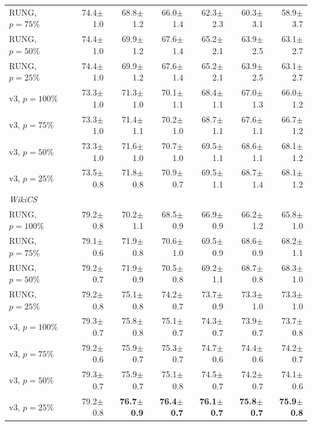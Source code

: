 \documentclass{article}
\newcommand{\score}[2]{#1{\scriptsize$\pm$#2}}
\begin{document}
\begin{center}
\begin{tabular}{lrrrrrr}
RUNG, $p{=}75\%$  & \score{74.4}{1.0} & \score{68.8}{1.2} & \score{66.0}{1.4} & \score{62.3}{2.3} & \score{60.3}{3.1} & \score{58.9}{3.7} \\
RUNG, $p{=}50\%$  & \score{74.4}{1.0} & \score{69.9}{1.2} & \score{67.6}{1.4} & \score{65.2}{2.1} & \score{63.9}{2.5} & \score{63.1}{2.7} \\
RUNG, $p{=}25\%$  & \score{74.4}{1.0} & \score{69.9}{1.2} & \score{67.6}{1.4} & \score{65.2}{2.1} & \score{63.9}{2.5} & \score{63.1}{2.7} \\
\addlinespace
v3, $p{=}100\%$   & \score{73.3}{1.0} & \score{71.3}{1.0} & \score{70.1}{1.1} & \score{68.4}{1.1} & \score{67.0}{1.3} & \score{66.0}{1.2} \\
v3, $p{=}75\%$    & \score{73.3}{1.0} & \score{71.4}{1.1} & \score{70.2}{1.0} & \score{68.7}{1.1} & \score{67.6}{1.1} & \score{66.7}{1.2} \\
v3, $p{=}50\%$    & \score{73.3}{1.0} & \score{71.6}{1.0} & \score{70.7}{1.0} & \score{69.5}{1.1} & \score{68.6}{1.1} & \score{68.1}{1.2} \\
v3, $p{=}25\%$    & \score{73.5}{0.8} & \score{71.8}{0.8} & \score{70.9}{0.7} & \score{69.5}{1.1} & \score{68.7}{1.4} & \score{68.1}{1.2} \\
\midrule
\multicolumn{7}{l}{\textit{WikiCS}} \\
\midrule
RUNG, $p{=}100\%$ & \score{79.2}{0.8} & \score{70.2}{1.1} & \score{68.5}{0.9} & \score{66.9}{0.9} & \score{66.2}{1.2} & \score{65.8}{1.0} \\
RUNG, $p{=}75\%$  & \score{79.1}{0.6} & \score{71.9}{0.8} & \score{70.6}{1.0} & \score{69.5}{0.9} & \score{68.6}{0.9} & \score{68.2}{1.1} \\
RUNG, $p{=}50\%$  & \score{79.2}{0.7} & \score{71.9}{0.9} & \score{70.5}{0.8} & \score{69.2}{1.1} & \score{68.7}{0.8} & \score{68.3}{1.0} \\
RUNG, $p{=}25\%$  & \score{79.2}{0.8} & \score{75.1}{0.8} & \score{74.2}{0.7} & \score{73.7}{0.9} & \score{73.3}{1.0} & \score{73.3}{1.0} \\
\addlinespace
v3, $p{=}100\%$   & \score{79.3}{0.7} & \score{75.8}{0.8} & \score{75.1}{0.7} & \score{74.3}{0.7} & \score{73.9}{0.7} & \score{73.7}{0.8} \\
v3, $p{=}75\%$    & \score{79.2}{0.6} & \score{75.9}{0.7} & \score{75.3}{0.7} & \score{74.7}{0.6} & \score{74.4}{0.6} & \score{74.2}{0.7} \\
v3, $p{=}50\%$    & \score{79.3}{0.7} & \score{75.9}{0.7} & \score{75.1}{0.8} & \score{74.5}{0.7} & \score{74.2}{0.7} & \score{74.1}{0.6} \\
v3, $p{=}25\%$    & \score{79.2}{0.8} & \textbf{\score{76.7}{0.9}} & \textbf{\score{76.4}{0.7}} & \textbf{\score{76.1}{0.7}} & \textbf{\score{75.8}{0.7}} & \textbf{\score{75.9}{0.8}} \\
\bottomrule
\end{tabular}
\end{center}
\end{document}
